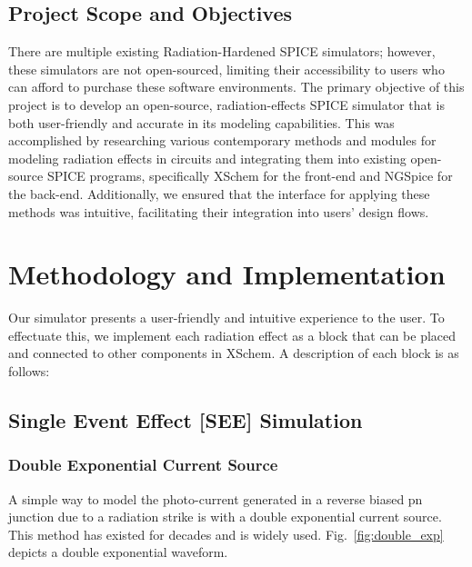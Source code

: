 \documentclass[conference]{IEEEtran}
\begin{document}
    \subsection{Project Scope and Objectives}\label{subsec:project-scope-and-objectives}
    There are multiple existing Radiation-Hardened SPICE simulators; however, these simulators are not open-sourced, limiting their accessibility to users who can afford to purchase these software environments.
    The primary objective of this project is to develop an open-source, radiation-effects SPICE simulator that is both user-friendly and accurate in its modeling capabilities.
    This was accomplished by researching various contemporary methods and modules for modeling radiation effects in circuits and integrating them into existing open-source SPICE programs, specifically XSchem for the front-end and NGSpice for the back-end.
    Additionally, we ensured that the interface for applying these methods was intuitive, facilitating their integration into users' design flows.


    \section{Methodology and Implementation}\label{sec:methodology-and-implementation}
    Our simulator presents a user-friendly and intuitive experience to the user.
    To effectuate this, we implement each radiation effect as a block that can be placed and connected to other components in XSchem.
    A description of each block is as follows:

    \vspace{1em}

    \subsection{Single Event Effect [SEE] Simulation}\label{subsec:single-event-effect-[see]-simulation}

    \subsubsection{Double Exponential Current Source}
    A simple way to model the photo-current generated in a reverse biased pn junction due to a radiation strike is with a double exponential current source.
    This method has existed for decades and is widely used.
    Fig.~\ref{fig:double_exp} depicts a double exponential waveform.
\end{document}
